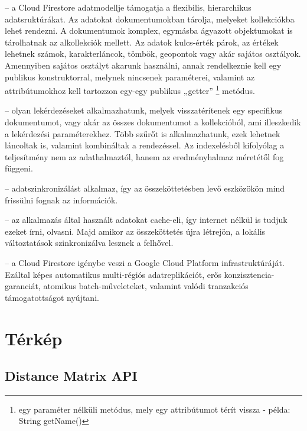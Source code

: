 \begin{description}
	\setlength{\itemsep}{0.04mm}
	\item[Rugalmasság] -- a Cloud Firestore adatmodellje támogatja a flexibilis, hierarchikus adatsruktúrákat. Az adatokat dokumentumokban tárolja, melyeket kollekciókba lehet rendezni. A dokumentumok komplex, egymásba ágyazott objektumokat is tárolhatnak az alkollekciók mellett. Az adatok kulcs-érték párok, az értékek lehetnek számok, karakterláncok, tömbök, geopontok vagy akár sajátos osztályok. Amennyiben sajátos osztályt akarunk használni, annak rendelkeznie kell egy publikus konstruktorral, melynek nincsenek paraméterei, valamint az attribútumokhoz kell tartozzon egy-egy publikus „getter”%
	\footnote{ %
		egy paraméter nélküli metódus, mely egy attribútumot térít vissza - példa: String getName()
	}  %
	metódus.
	\item[Kifejező lekérdezés] -- olyan lekérdezéseket alkalmazhatunk, melyek visszatérítenek egy specifikus dokumentumot, vagy akár az összes dokumentumot a kollekcióból, ami illeszkedik a lekérdezési paraméterekhez. Több szűrőt is alkalmazhatunk, ezek lehetnek láncoltak is, valamint kombináltak a rendezéssel. Az indexelésből kifolyólag a teljesítmény nem az adathalmaztól, hanem az eredményhalmaz méretétől fog függeni.
	\item[Valós idejű frissítések] -- adatszinkronizálást alkalmaz, így az összeköttetésben levő eszközökön mind frissülni fognak az információk.
	\item[Offline támogatás] -- az alkalmazás által használt adatokat cache-eli, így internet nélkül is tudjuk ezeket írni, olvasni. Majd amikor az összeköttetés újra létrejön, a lokális változtatások szinkronizálva lesznek a felhővel.
	\item[Skálázhatóság] -- a Cloud Firestore igénybe veszi a Google Cloud Platform infrastruktúráját. Ezáltal képes automatikus multi-régiós adatreplikációt, erős konzisztencia-garanciát, atomikus batch-műveleteket, valamint valódi tranzakciós támogatottságot nyújtani. 
\end{description}


\section{Térkép}

\subsection{Distance Matrix API}

